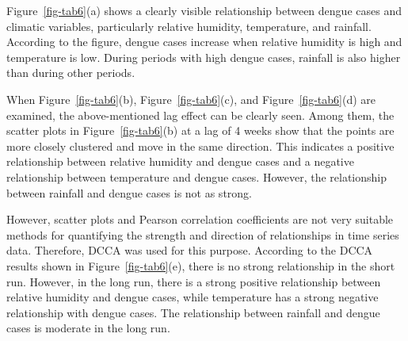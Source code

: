 \documentclass[
]{article}
\begin{document}
Figure~\ref{fig-tab6}(a) shows a clearly visible relationship between
dengue cases and climatic variables, particularly relative humidity,
temperature, and rainfall. According to the figure, dengue cases
increase when relative humidity is high and temperature is low. During
periods with high dengue cases, rainfall is also higher than during
other periods.

When Figure~\ref{fig-tab6}(b), Figure~\ref{fig-tab6}(c), and
Figure~\ref{fig-tab6}(d) are examined, the above-mentioned lag effect
can be clearly seen. Among them, the scatter plots in
Figure~\ref{fig-tab6}(b) at a lag of 4 weeks show that the points are
more closely clustered and move in the same direction. This indicates a
positive relationship between relative humidity and dengue cases and a
negative relationship between temperature and dengue cases. However, the
relationship between rainfall and dengue cases is not as strong.

However, scatter plots and Pearson correlation coefficients are not very
suitable methods for quantifying the strength and direction of
relationships in time series data. Therefore, DCCA was used for this
purpose. According to the DCCA results shown in
Figure~\ref{fig-tab6}(e), there is no strong relationship in the short
run. However, in the long run, there is a strong positive relationship
between relative humidity and dengue cases, while temperature has a
strong negative relationship with dengue cases. The relationship between
rainfall and dengue cases is moderate in the long run.
\end{document}
